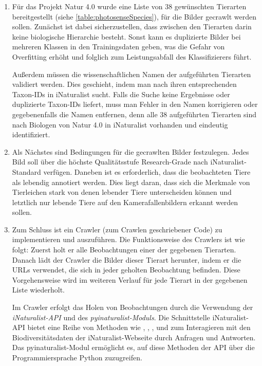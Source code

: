 \begin{enumerate}
	\item Für das Projekt Natur 4.0 wurde eine Liste von 38 gewünschten Tierarten bereitgestellt (siehe \autoref{table:photosenseSpecies}), für die Bilder gecrawlt werden sollen. Zunächst ist dabei sicherzustellen, dass zwischen den Tierarten darin keine biologische Hierarchie besteht. Sonst kann es duplizierte Bilder bei mehreren Klassen in den Trainingsdaten geben, was die Gefahr von Overfitting erhöht und folglich zum Leistungsabfall des Klassifizierers führt. 
	
	Außerdem müssen die wissenschaftlichen Namen der aufgeführten Tierarten validiert werden. Dies geschieht, indem man nach ihren entsprechenden Taxon-IDs in iNaturalist sucht. Falls die Suche keine Ergebnisse oder duplizierte Taxon-IDs liefert, muss man Fehler in den Namen korrigieren oder gegebenenfalls die Namen entfernen, denn alle 38 aufgeführten Tierarten sind nach Biologen von Natur 4.0 in iNaturalist vorhanden und eindeutig identifiziert.
	
	\item Als Nächstes sind Bedingungen für die gecrawlten Bilder festzulegen. Jedes Bild soll über die höchste Qualitätsstufe Research-Grade nach iNaturalist-Standard verfügen. Daneben ist es erforderlich, dass die beobachteten Tiere als lebendig annotiert werden. Dies liegt daran, dass sich die Merkmale von Tierleichen stark von denen lebender Tiere unterscheiden können und letztlich nur lebende Tiere auf den Kamerafallenbildern erkannt werden sollen.
	
	\item Zum Schluss ist ein Crawler (zum Crawlen geschriebener Code) zu implementieren und auszuführen. Die Funktionsweise des Crawlers ist wie folgt: Zuerst holt er alle Beobachtungen einer der gegebenen Tierarten.	Danach lädt der Crawler die Bilder dieser Tierart herunter, indem er die URLs verwendet, die sich in jeder geholten Beobachtung befinden. Diese Vorgehensweise wird im weiteren Verlauf für jede Tierart in der gegebenen Liste wiederholt. 
	
	Im Crawler erfolgt das Holen von Beobachtungen durch die Verwendung der \emph{iNaturalist-API} und des \emph{pyinaturalist-Moduls}. Die Schnittstelle iNaturalist-API bietet eine Reihe von Methoden wie , , ,  und  zum Interagieren mit den Biodiversitätsdaten der iNaturalist-Webseite durch Anfragen und Antworten. Das pyinaturalist-Modul ermöglicht es, auf diese Methoden der API über die Programmiersprache Python zuzugreifen.
	
	
\end{enumerate}


